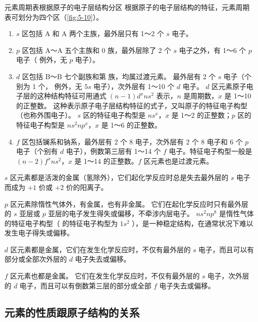 \begin{Reading}{元素周期表根据原子的电子层结构分区}
根据原子的电子层结构的特征，元素周期表可划分为四个区（\cref{fig:5-10}）。
\begin{figurehere}
  \begin{minipage}{\linewidth}\centering
    \caption{元素周期表根据原子的电子层结构分区}\label{fig:5-10}
  \end{minipage}
\end{figurehere}
\begin{enumerate}
  \item $s$ 区包括 A 和 A 两个主族，最外层只有 1～2 个 $s$ 电子。
  \item $p$ 区包括 A～A 五个主族和 0 族，最外层除了 2 个 $s$ 电子之外，有 1～6 个 $p$ 电子（ 例外，无 $p$ 电子）。
  \item $d$ 区包括 B～B 七个副族和第  族，均属过渡元素。
  最外层有 2 个 $s$ 电子（个别为 1 个， 例外，无 $5s$ 电子），次外层有 1～10 个 $d$ 电子。 $d$ 区元素原子电子层的这种结构特征可用通式 $(n-1)d^xns^2$ 表示，$n$ 是周期数，$x$ 是 1～10 的正整数。
  这种表示原子电子层结构特征的式子，又叫原子的特征电子构型（也称外围电子）。
  $s$ 区的特征电子构型是 $ns^x$，$x$ 是 1～2 的正整数；$p$ 区的特征电子构型是 $ns^2np^x$，$x$ 是 1～6 的正整数。
  \item $f$ 区包括镧系和钠系，最外层有 2 个 8 电子，次外层有 2 个 8 电子和 6 个 $p$ 电子（个别有 $d$ 电子），例数第三层有 1～14 个 $f$ 电子。特征电子构型一般是 $(n-2)f^xns^2$，$x$ 是 1～14 的正整数。$f$ 区元素也是过渡元素。
\end{enumerate}

$s$ 区元素都是活泼的金属（氢除外），它们起化学反应时总是失去最外层的 $s$ 电子而成为 $+1$ 价或 $+2$ 价的阳离子。

$p$ 区元素除惰性气体外，有金属，也有非金属。
它们在起化学反应时只有最外层的 $s$ 亚层或 $p$ 亚层的电子发生得失或偏移，不牵涉内层电子。
$ns^2np^8$ 是惰性气体的特征电子构型（ 的特征电子构型为 $1s^2$ ），是一种稳定结构，在通常状况下难以发生电子得失或偏移。

$d$ 区元素都是金属，它们在发生化学反应时，不仅有最外层的 $s$ 电子，而且可以有部分或全部次外层的 $d$ 电子失去或偏移。

$f$ 区元素也都是金属。
它们在发生化学反应时，不仅有最外层的 $s$ 电子，次外层的 $d$ 电子，而且可以有倒数第三层的部分或全部 $f$ 电子失去或偏移。
\end{Reading}

\subsection{元素的性质跟原子结构的关系}
